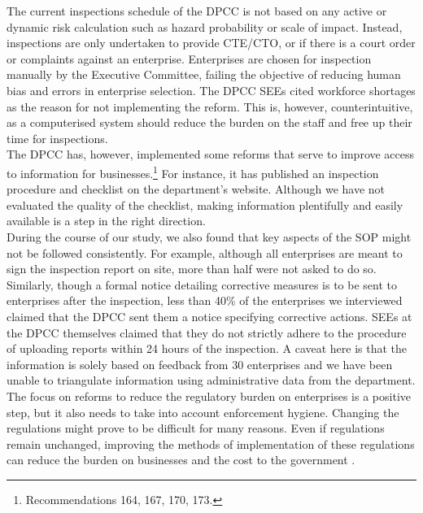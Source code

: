 \documentclass[a4paper, 12pt]{article}
\begin{document}
	The current inspections schedule of the DPCC is not based on any active or dynamic risk calculation such as hazard probability or scale of impact. Instead, inspections are only undertaken to provide CTE/CTO, or if there is a court order or complaints against an enterprise. Enterprises are chosen for inspection manually by the Executive Committee, failing the objective of reducing human bias and errors in enterprise selection. The DPCC SEEs cited workforce shortages as the reason for not implementing the reform. This is, however, counterintuitive, as a computerised system should reduce the burden on the staff and free up their time for inspections. \\
	
	The DPCC has, however, implemented some reforms that serve to improve access to information for businesses.\footnote{Recommendations 164, 167, 170, 173.} For instance, it has published an inspection procedure and checklist on the department’s website. Although we have not evaluated the quality of the checklist, making information plentifully and easily available is a step in the right direction. \\
	
	During the course of our study, we also found that key aspects of the SOP might not be followed consistently. For example, although all enterprises are meant to sign the inspection report on site, more than half were not asked to do so. Similarly, though a formal notice detailing corrective measures is to be sent to enterprises after the inspection, less than 40\% of the enterprises we interviewed claimed that the DPCC sent them a notice specifying corrective actions. SEEs at the DPCC themselves claimed that they do not strictly adhere to the procedure of uploading reports within 24 hours of the inspection. A caveat here is that the information is solely based on feedback from 30 enterprises and we have been unable to triangulate information using administrative data from the department. \\
	
	The focus on reforms to reduce the regulatory burden on enterprises is a positive step, but it also needs to take into account enforcement hygiene. Changing the regulations might prove to be difficult for many reasons. Even if regulations remain unchanged, improving the methods of implementation of these regulations can reduce the burden on businesses and the cost to the government \parencite{blancflorentin}. \\
	
\end{document}
